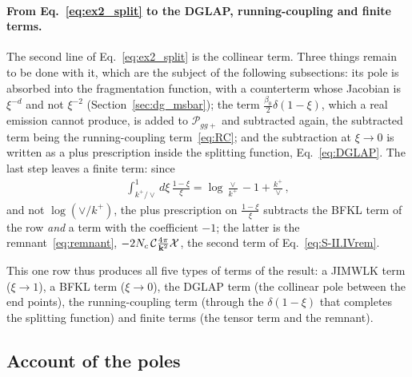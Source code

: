 \paragraph{From Eq.~\eqref{eq:ex2_split} to the DGLAP, running-coupling and finite terms.} The second line of Eq.~\eqref{eq:ex2_split} is the collinear term. Three things remain to be done with it, which are the subject of the following subsections: its pole is absorbed into the fragmentation function, with a counterterm whose Jacobian is $\xi^{-d}$ and not $\xi^{-2}$ (Section~\ref{sec:dg_msbar}); the term $\frac{\beta_0}{2}\delta(1-\xi)$, which a real emission cannot produce, is added to $\mathcal P_{gg+}$ and subtracted again, the subtracted term being the running-coupling term~\eqref{eq:RC}; and the subtraction at $\xi\to0$ is written as a plus prescription inside the splitting function, Eq.~\eqref{eq:DGLAP}. The last step leaves a finite term: since
\begin{align}\label{eq:ex2_rem}
\int_{k^+/\vee}^1d\xi\,\frac{1-\xi}{\xi}=\log\frac{\vee}{k^+}-1+\frac{k^+}{\vee}\,,
\end{align}
and not $\log(\vee/k^+)$, the plus prescription on $\frac{1-\xi}{\xi}$ subtracts the BFKL term of the row \emph{and} a term with the coefficient $-1$; the latter is the remnant~\eqref{eq:remnant}, $-2N_c\,\mathcal C\frac{4\pi}{\mathbf{k}^2}\mathcal X$, the second term of Eq.~\eqref{eq:S-II.IVrem}.

This one row thus produces all five types of terms of the result: a JIMWLK term ($\xi\to1$), a BFKL term ($\xi\to0$), the DGLAP term (the collinear pole between the end points), the running-coupling term (through the $\delta(1-\xi)$ that completes the splitting function) and finite terms (the tensor term and the remnant).

\subsection{Account of the poles}\label{sec:dg_poles}

